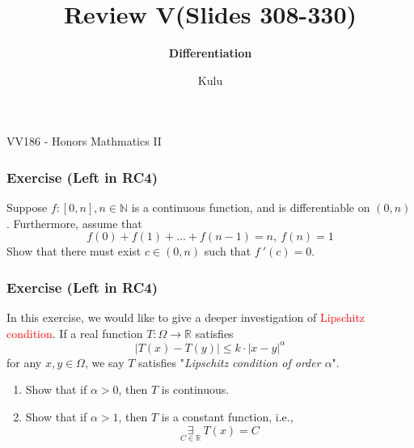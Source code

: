 \documentclass{beamer}
\title{\sffamily Review V(Slides 308-330)}
\subtitle{\textbf{Differentiation}\\ }
\institute[UM-SJTU JI]{University of Michigan-Shanghai Jiao Tong University Joint Institute}
\author{Kulu}
\newcommand{\myfont}{\rmfamily\normalsize\upshape\mdseries}
\begin{document}
\begin{titlepage}
    \begin{center}
        VV186 - Honors Mathmatics II
    \end{center}
\end{titlepage}
\myfont

\begin{frame}
    \frametitle{Exercise (Left in RC4)}
    Suppose $f:[0,n],n\in \mathbb{N}$ is a continuous function, and is differentiable on $(0,n)$. Furthermore, assume that
    \begin{equation*}
        f(0)+f(1)+\dots+f(n-1)=n,\ f(n)=1
    \end{equation*}
    Show that there must exist $c\in (0,n)$ such that $f~'(c)=0$.

\end{frame}

\begin{frame}
    \frametitle{Exercise (Left in RC4)}
    In this  exercise, we would like to give a deeper investigation of \textcolor{red}{Lipschitz condition}. If a real function $T:\Omega\rightarrow\mathbb{R}$
    satisfies
    \begin{equation*}
        |T(x)-T(y)|\leq k\cdot |x-y|^\alpha
    \end{equation*}
    for any $x,y\in \Omega$, we say $T$ satisfies "\emph{Lipschitz condition of order $\alpha$}".
    \begin{enumerate}
        \item Show that if $\alpha>0$, then $T$ is continuous.
        \item Show that if $\alpha>1$, then $T$ is a constant function, i.e.,
              \begin{equation*}
                  \underset{C\in \mathbb{R}}{\exists}\ T(x)=C
              \end{equation*}
    \end{enumerate}

\end{frame}
\end{document}
